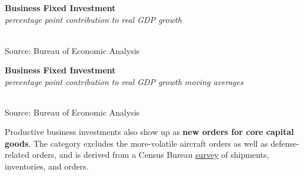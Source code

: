 \documentclass{report}
\makeatletter
\newcommand{\tbllink}[1]{\href{https://raw.githubusercontent.com/bdecon/US-chartbook/master/chartbook/data/#1}{\faTable}}
\newcommand*\short[1]{\expandafter\@gobbletwo\number\numexpr#1\relax}
\newcommand{\sbar}[4]{
		\addplot[ybar stacked, bar width=2.45pt, draw opacity=0, fill=#1] 
			table [x=#2, y=#3, col sep=comma]{#4};}
\newcommand{\dateaxisticks}{
		date coordinates in=x, axis line style={draw=none},
		xmax={2022-03-15},
		max space between ticks=40,	    
		xtick={{1990-01-01}, {1992-01-01}, {1994-01-01}, 
			{1996-01-01}, {1998-01-01}, {2000-01-01}, 
			{2002-01-01}, {2004-01-01}, {2006-01-01},
			{2008-01-01}, {2010-01-01}, {2012-01-01}, {2014-01-01},
		    {2016-01-01}, {2018-01-01}, {2020-01-01}, {2022-01-01}, 
		    {2024-01-01}, {2026-01-01}},
		minor xtick={{1989-01-01}, {1991-01-01}, {1993-01-01},
			{1995-01-01}, {1997-01-01}, {1999-01-01}, 
			{2001-01-01}, {2003-01-01}, {2005-01-01}, {2007-01-01},
		    {2009-01-01}, {2011-01-01}, {2013-01-01}, {2015-01-01},
		    {2017-01-01}, {2019-01-01}, {2021-01-01}, {2023-01-01}, 
		    {2025-01-01}, {2027-01-01}},
		enlarge y limits={0.06}, enlarge x limits={0.01},
		}
\newcommand{\bbar}[2]{extra #1 ticks = {{#2}}, extra #1 tick labels = ,
		extra #1 tick style = {grid=major, grid style={thick, black!25}},}
\newcommand{\rbars}{
		\fill[color=black!10] (axis cs:{1990-07-01},\pgfkeysvalueof{/pgfplots/ymin}) rectangle 
			(axis cs:{1991-03-01}, \pgfkeysvalueof{/pgfplots/ymax});
		\fill[color=black!10] (axis cs:{2007-12-01},\pgfkeysvalueof{/pgfplots/ymin}) rectangle 
			(axis cs:{2009-07-01}, \pgfkeysvalueof{/pgfplots/ymax});
		\fill[color=black!10] (axis cs:{2001-03-01},\pgfkeysvalueof{/pgfplots/ymin}) rectangle 
			(axis cs:{2001-11-01}, \pgfkeysvalueof{/pgfplots/ymax});
		\fill[color=black!10] (axis cs:{2020-02-01},\pgfkeysvalueof{/pgfplots/ymin}) rectangle 
			(axis cs:{2020-05-01}, \pgfkeysvalueof{/pgfplots/ymax});}
\makeatother
\begin{document}
{\begin{minipage}{0.76\textwidth}
\normalsize \textbf{Business Fixed Investment}\\
\footnotesize{\textit{percentage point contribution to real GDP growth}}\\
\hspace*{-2mm} \\
\footnotesize{Source: Bureau of Economic Analysis} \hfill \tbllink{businv.csv}
\vspace{2mm}

\normalsize \textbf{Business Fixed Investment}\\
\footnotesize{\textit{percentage point contribution to real GDP growth \hspace{36mm} moving averages}}\\ 
 \setlength{\tabcolsep}{3.1pt} \color{black!90}
		{\renewcommand{\arraystretch}{1.55}
		 \begin{tabular}{p{42mm} R{6.7mm} R{6.7mm} R{6.7mm} R{6.7mm} R{6.7mm} 
		   R{7.8mm} R{6.7mm} R{6.7mm} }
			  \hline
		\end{tabular}}\vspace{-2mm}
		
\footnotesize{Source: Bureau of Economic Analysis}
\end{minipage}
\newpage
\begin{minipage}{0.32\textwidth}
\small Productive business investments also show up as \textbf{new orders for core capital goods}. The category excludes the more-volatile aircraft orders as well as defense-related orders, and is derived from a Census Bureau \href{https://www.census.gov/manufacturing/m3/index.html}{survey} of shipments, inventories, and orders.  


\end{minipage}}
\end{document}
